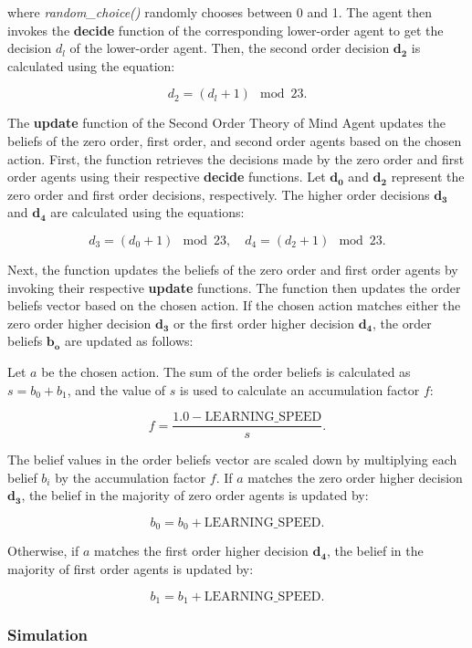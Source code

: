where \textit{random\_choice()} randomly chooses between 0 and 1. The agent then invokes the \textbf{decide} function of the corresponding lower-order agent to get the decision $d_l$ of the lower-order agent. Then, the second order decision $\mathbf{d_2}$  is calculated using the equation:

\label{eq:second-order-decide}
\[
d_2 = (d_l + 1) \mod 23.
\]


The \textbf{update} function of the Second Order Theory of Mind Agent updates the beliefs of the zero order, first order, and second order agents based on the chosen action. First, the function retrieves the decisions made by the zero order and first order agents using their respective \textbf{decide} functions. Let $\mathbf{d_0}$ and $\mathbf{d_2}$ represent the zero order and first order decisions, respectively. The higher order decisions $\mathbf{d_3}$ and $\mathbf{d_4}$ are calculated using the equations:

\[
d_3 = (d_0 + 1) \mod 23, \quad d_4 = (d_2 + 1) \mod 23.
\]

Next, the function updates the beliefs of the zero order and first order agents by invoking their respective \textbf{update} functions. The function then updates the order beliefs vector based on the chosen action. If the chosen action matches either the zero order higher decision $\mathbf{d_3}$ or the first order higher decision $\mathbf{d_4}$, the order beliefs $\mathbf{b_o}$ are updated as follows:

Let $a$ be the chosen action. The sum of the order beliefs is calculated as $s = b_0 + b_1$, and the value of $s$ is used to calculate an accumulation factor $f$:

\[
f = \frac{{1.0 - \text{{LEARNING\_SPEED}}}}{s}.
\]

The belief values in the order beliefs vector are scaled down by multiplying each belief $b_i$ by the accumulation factor $f$. If $a$ matches the zero order higher decision $\mathbf{d_3}$, the belief in the majority of zero order agents is updated by:

\[
b_0 = b_0 + \text{{LEARNING\_SPEED}}.
\]

Otherwise, if $a$ matches the first order higher decision $\mathbf{d_4}$, the belief in the majority of first order agents is updated by:

\[
b_1 = b_1 + \text{{LEARNING\_SPEED}}.
\]

\subsubsection{Simulation}

